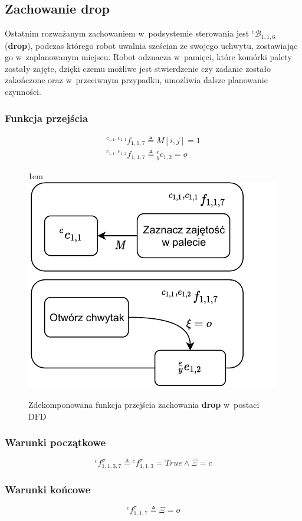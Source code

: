 
\subsection{Zachowanie drop}
\label{subsec:cs-drop}
Ostatnim rozważanym zachowaniem w~podsystemie sterowania jest ${}^{c}\mathcal{B}_{1,1,6}$ (\textbf{drop}), podczas którego robot uwalnia sześcian ze swojego uchwytu, zostawiając go w~zaplanowanym miejscu. Robot odznacza w~pamięci, które komórki palety zostały zajęte, dzięki czemu możliwe jest stwierdzenie czy zadanie zostało zakończone oraz w~przeciwnym przypadku, umożliwia dalsze planowanie czynności.

\subsubsection{Funkcja przejścia}
\begin{equation}
    \begin{gathered}
        {}^{c_{1,1}, c_{1,1}}f_{1,1,7} \triangleq M[i,j] = 1 \\
        {}^{c_{1,1}, e_{1,2}}f_{1,1,7} \triangleq {}^{e}_{y}c_{1,2} = o
    \end{gathered}
\end{equation}

\begin{figure}[ht]
    \leftskip1em
    \includegraphics[width=\columnwidth]{figures/ISR-cs-fp-drop.pdf}
    \caption{Zdekomponowana funkcja przejścia zachowania \textbf{drop} w~postaci DFD}
    \label{fig:cs-fp-drop}
\end{figure}

\subsubsection{Warunki początkowe}
\begin{equation}
    {}^{c}f^{\sigma}_{1,1,3,7} \triangleq {}^{c}f^{\tau}_{1,1,3} = True \land \Xi = c
\end{equation}

\subsubsection{Warunki końcowe}
\begin{equation}
    {}^{c}f^{\tau}_{1,1,7} \triangleq \Xi = o
\end{equation}
